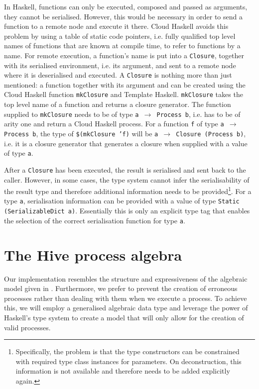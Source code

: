 In Haskell, functions can only be executed, composed and passed as arguments, they cannot be serialised. However, this would be necessary in order to send a function to a remote node and execute it there. \textsf{Cloud Haskell} avoids this problem by using a table of static code pointers, i.e. fully qualified top level names of functions that are known at compile time, to refer to functions by a name. For remote execution, a function's name is put into a \texttt{Closure}, together with its serialised environment, i.e. its argument, and sent to a remote node where it is deserialised and executed. A \texttt{Closure} is nothing more than just mentioned: a function together with its argument \cite{Epstein:2011:THC:2034675.2034690} and can be created using the \textsf{Cloud Haskell} function \texttt{mkClosure} and \textsf{Template Haskell}. \texttt{mkClosure} takes the top level name of a function and returns a closure generator. The function supplied to \texttt{mkClosure} needs to be of type \texttt{a $\to$ Process b}, i.e. has to be of arity one and return a \textsf{Cloud Haskell} process. For a function \texttt{f} of type \texttt{a $\to$ Process b}, the type of \texttt{\$(mkClosure 'f)} will be \texttt{a $\to$ Closure (Process b)}, i.e. it is a closure generator that generates a closure when supplied with a value of type \texttt{a}.

After a \texttt{Closure} has been executed, the result is serialised and sent back to the caller. However, in some cases, the type system cannot infer the serialisability of the result type and therefore additional information needs to be provided\footnote{Specifically, the problem is that the type constructors can be constrained with required type class instances for parameters. On deconstruction, this information is not available and therefore needs to be added explicitly again.}. For a type \texttt{a}, serialisation information can be provided with a value of type \texttt{Static (SerializableDict a)}. Essentially this is only an explicit type tag that enables the selection of the correct serialisation function for type \texttt{a}.

\section{The Hive process algebra}
Our implementation resembles the structure and expressiveness of the algebraic model given in . Furthermore, we prefer to prevent the creation of erroneous processes rather than dealing with them when we execute a process. To achieve this, we will employ a generalised algebraic data type and leverage the power of Haskell's type system to create a model that will only allow for the creation of valid processes.

